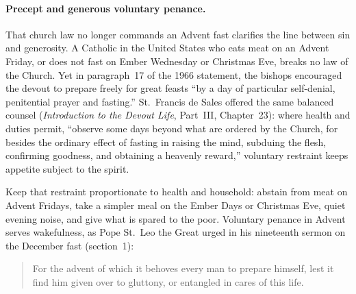\paragraph{Precept and generous voluntary penance.}
That church law no longer commands an Advent fast clarifies the line between sin and generosity. A Catholic in the United States who eats meat on an Advent Friday, or does not fast on Ember Wednesday or Christmas Eve, breaks no law of the Church. Yet in paragraph~17 of the 1966 statement, the bishops encouraged the devout to prepare freely for great feasts ``by a day of particular self-denial, penitential prayer and fasting.'' St.~Francis de Sales offered the same balanced counsel (\textit{Introduction to the Devout Life}, Part~III, Chapter~23): where health and duties permit, ``observe some days beyond what are ordered by the Church, for besides the ordinary effect of fasting in raising the mind, subduing the flesh, confirming goodness, and obtaining a heavenly reward,'' voluntary restraint keeps appetite subject to the spirit.

Keep that restraint proportionate to health and household: abstain from meat on Advent Fridays, take a simpler meal on the Ember Days or Christmas Eve, quiet evening noise, and give what is spared to the poor. Voluntary penance in Advent serves wakefulness, as Pope St.~Leo the Great urged in his nineteenth sermon on the December fast (section~1):

\begin{quote}
For the advent of which it behoves every man to prepare himself, lest it find him given over to gluttony, or entangled in cares of this life.
\end{quote}
